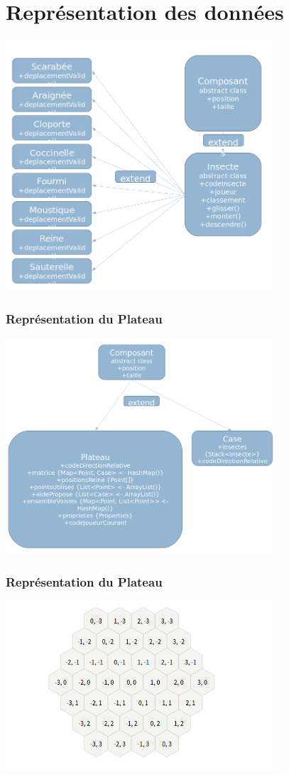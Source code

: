 \documentclass{beamer}
\begin{document}
\section{Repr\'esentation des donn\'ees}
  \begin{frame}
  \end{frame}
    \begin{frame}
        \includegraphics[width=10cm]{insecteRepres.png}
    \end{frame}
    \begin{frame}
        \frametitle{Repr\'esentation du Plateau}
        \includegraphics[width=10cm]{plaeayRepres.png}
    \end{frame}
    \begin{frame}
        \frametitle{Repr\'esentation du Plateau}
        \includegraphics[width=10cm]{./grid.png}
    \end{frame}
\end{document}
